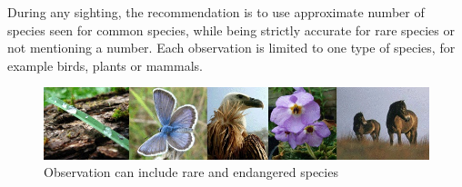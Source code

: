 During any sighting, the recommendation is to use approximate number of species seen for common species, while being strictly accurate for rare species or not mentioning a number. Each observation is limited to one type of species, for example birds, plants or mammals.

\begin{figure}[htb]
	\centering
	\includegraphics[width=1\textwidth]{prestudy/field_study/flora_fauna_Nikola.jpg}
	\caption{Observation can include rare and endangered species}
	\label{fig:field_study_species}
\end{figure}


